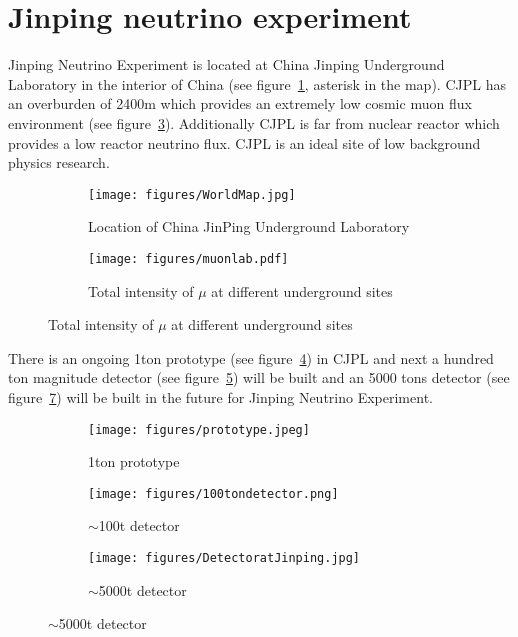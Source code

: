 \section{Jinping neutrino experiment} %
Jinping Neutrino Experiment is located at China Jinping Underground Laboratory in the interior of China (see figure~\ref{fig:cjpl}, asterisk in the map). CJPL has an overburden of 2400m which provides an extremely low cosmic muon flux environment (see figure~\ref{fig:muon}). Additionally CJPL is far from nuclear reactor which provides a low reactor neutrino flux. CJPL is an ideal site of low background physics research. 

\begin{figure}[H]
\begin{minipage}[b]{.55\textwidth}
\begin{figure}[H]
    \centering
    \texttt{[image: figures/WorldMap.jpg]}
    \caption{\label{fig:cjpl} Location of China JinPing Underground Laboratory}
\end{figure}
\end{minipage}
\begin{minipage}[b]{.45\textwidth}
\begin{figure}[H]
    \centering
    \texttt{[image: figures/muonlab.pdf]}
    \caption{\label{fig:muon} Total intensity of $\mu$ at different underground sites}
\end{figure}
\end{minipage}
\end{figure}

There is an ongoing 1ton prototype (see figure~\ref{fig:1t}) in CJPL and next a hundred ton magnitude detector (see figure~\ref{fig:100t}) will be built and an 5000 tons detector (see figure~\ref{fig:1kt}) will be built in the future for Jinping Neutrino Experiment. 

\begin{figure}[H]
\begin{minipage}[b]{.33\textwidth}
\begin{figure}[H]
    \centering
    \texttt{[image: figures/prototype.jpeg]}
    \caption{\label{fig:1t} 1ton prototype}
\end{figure}
\end{minipage}
\begin{minipage}[b]{.33\textwidth}
\begin{figure}[H]
    \centering
    \texttt{[image: figures/100tondetector.png]}
    \caption{\label{fig:100t} $\sim$100t detector}
\end{figure}
\end{minipage}
\begin{minipage}[b]{.33\textwidth}
\begin{figure}[H]
    \centering
    \texttt{[image: figures/DetectoratJinping.jpg]}
    \caption{\label{fig:1kt} $\sim$5000t detector}
\end{figure}
\end{minipage}
\end{figure}

